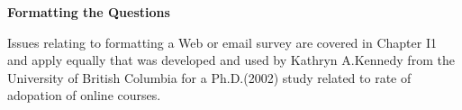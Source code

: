 \documentclass[10pt,a4paper]{book}
\begin{document}
\begin{flushleft}
  \textbf{\textsf{Formatting the Questions}}
\end{flushleft}

Issues relating to formatting a Web or email survey are covered in Chapter I1 and apply equally that was developed and used by Kathryn A.Kennedy from the University of British Columbia for a Ph.D.(2002) study related to rate of adopation of online courses.
\end{document}
